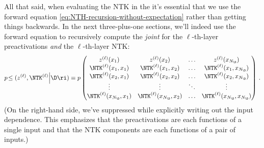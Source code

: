 All that said, when evaluating the NTK in the  it's essential that we use the forward equation \eqref{eq:NTH-recursion-without-expectation}  rather than getting things backwards.
In the next three-plus-one sections, we'll indeed use the forward equation to recursively compute the \emph{joint}  for the $\ell$-th-layer preactivations \emph{and} the $\ell$-th-layer NTK:  %
\begin{align}\label{eq:joint-preactivation-NTK}
&p\!\le(z^{(\ell)}, \NTK^{(\ell)}\Big\vert \D\ri)  \equiv p
\begin{pmatrix}
z^{(\ell)}(x_1) & z^{(\ell)}(x_2) & \ldots &  z^{(\ell)}(x_{N_\D})\\
\NTK^{(\ell) }(x_1, x_1) & \NTK^{(\ell) }(x_1, x_2)& \ldots & \NTK^{(\ell) }(x_1, x_{N_\D})\\
\NTK^{(\ell) }(x_2, x_1) & \NTK^{(\ell) }(x_2, x_2) & \ldots & \NTK^{(\ell) }(x_2, x_{N_\D})\\
\vdots  & \vdots  & \ddots & \vdots  \\
\NTK^{(\ell) }(x_{N_\D}, x_1) & \NTK^{(\ell) }(x_{N_\D}, x_2) & \ldots & \NTK^{(\ell) }(x_{N_\D}, x_{N_\D}) \\ 
\end{pmatrix} \, .  \notag \\
\end{align}
(On the right-hand side, we've
suppressed  while explicitly writing out the input dependence.
This emphasizes that the preactivations are each functions of a single input and that the NTK components are each functions of a pair of inputs.)















